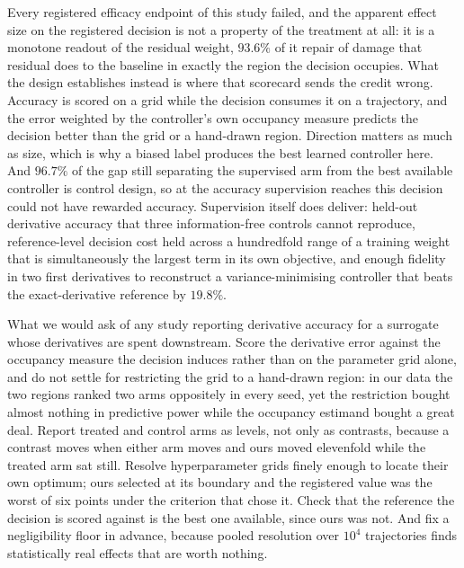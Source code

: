 \documentclass{article}
\begin{document}
Every registered efficacy endpoint of this study failed, and the apparent effect
size on the registered decision is not a property of the treatment at all: it is a
monotone readout of the residual weight, $93.6\%$ of it repair of damage that
residual does to the baseline in exactly the region the decision occupies. What the design establishes instead is where that scorecard sends the credit wrong.
Accuracy is scored on a grid while the decision consumes it on a trajectory, and the
error weighted by the controller's own occupancy measure predicts the decision
better than the grid or a hand-drawn region. Direction matters as much as size,
which is why a biased label produces the best learned controller here. And $96.7\%$
of the gap still separating the supervised arm from the best available controller is
control design, so at the accuracy supervision reaches this decision could not have
rewarded accuracy.
Supervision itself does deliver: held-out derivative accuracy that three
information-free controls cannot reproduce, reference-level decision cost held
across a hundredfold range of a training weight that is simultaneously the largest
term in its own objective, and enough fidelity in two first derivatives to
reconstruct a variance-minimising controller that beats the exact-derivative
reference by $19.8\%$.

What we would ask of any study reporting derivative accuracy for a surrogate whose
derivatives are spent downstream. Score the derivative error against the occupancy measure the decision induces rather
than on the parameter grid alone, and do not settle for restricting the grid to a
hand-drawn region: in our data the two regions ranked two arms oppositely in every
seed, yet the restriction bought almost nothing in predictive power while the
occupancy estimand bought a great deal. Report treated and control arms as levels, not only
as contrasts, because a contrast moves when either arm moves and ours moved
elevenfold while the treated arm sat still. Resolve hyperparameter grids finely
enough to locate their own optimum; ours selected at its boundary and the registered
value was the worst of six points under the criterion that chose it. Check that the
reference the decision is scored against is the best one available, since ours was
not. And fix a negligibility floor in advance, because pooled resolution over
$10^{4}$ trajectories finds statistically real effects that are worth nothing.
\end{document}
